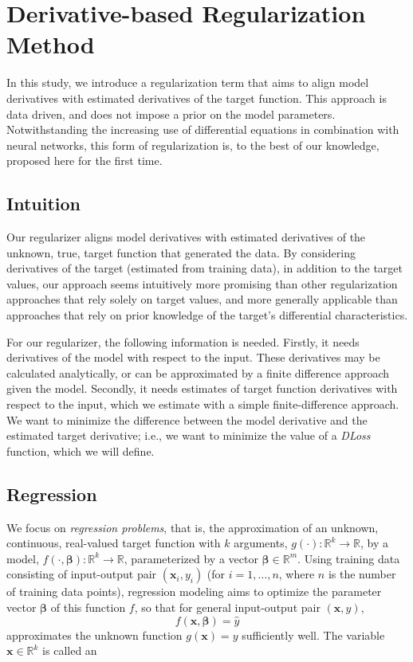 \documentclass[conference]{IEEEtran}
\begin{document}

\section{Derivative-based Regularization Method}\label{sec:method}

In this study, we introduce a regularization term that aims to align model derivatives with estimated derivatives of the target function.
This approach is data driven, and does not impose a prior on the model parameters. 
Notwithstanding the increasing use of differential equations in combination with neural networks, this form of regularization is, to the best of our knowledge, proposed here for the first time.

\subsection{Intuition}
Our regularizer aligns model derivatives with estimated derivatives of the unknown, true, target function that generated the data.
By considering derivatives of the target (estimated from training data), in addition to the target values, our approach seems intuitively more promising than other regularization approaches that rely solely on target values, and more generally applicable than approaches that rely on prior knowledge of the target's differential characteristics.

For our regularizer, the following information is needed.
Firstly, it needs derivatives of the model with respect to the input.
These derivatives may be calculated analytically, or can be approximated by a finite difference approach given the model.
Secondly, it needs estimates of target function derivatives with respect to the input, which we estimate with a simple finite-difference approach. 
We want to minimize the difference between the model derivative and the estimated target derivative; i.e., we want to minimize the value of a \emph{DLoss} function, which we will define.

\subsection{Regression}
\label{subsec_regressiontasks}

We focus on \emph{regression problems}, that is, the approximation of an unknown, continuous, real-valued target function with $k$ arguments, $g(\cdot):{\mathbb R}^{k}\to{\mathbb R}$, by a model, $f(\cdot,\boldsymbol{\beta}):{\mathbb R}^{k}\to{\mathbb R}$, parameterized by a vector $\boldsymbol{\beta}\in{\mathbb R}^m$. 
Using training data consisting of input-output pair $(\mathbf{x}_i,y_i)$ (for $i=1,\ldots,n$, where $n$ is the number of training data points), regression modeling aims to optimize the parameter vector $\boldsymbol{\beta}$ of this function $f$, so that for general input-output pair $(\mathbf{x},y)$, 
\begin{equation}
 f(\mathbf{x},\boldsymbol{\beta}) = \hat{y}
\end{equation}
approximates the unknown function $g(\mathbf{x})=y$ sufficiently well. 
The variable $\mathbf{x}\in\mathbb{R}^k$ is called an 
\end{document}
